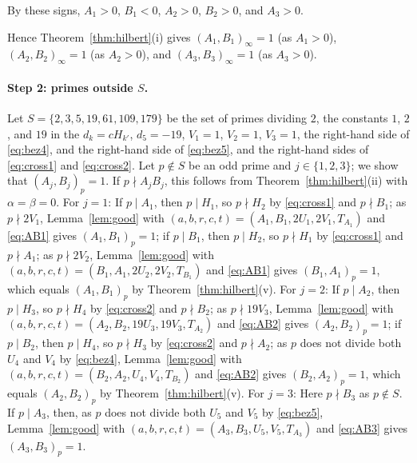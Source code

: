 \documentclass[11pt]{article}
\begin{document}
By these signs, $A_{1}>0$, $B_{1}<0$, $A_{2}>0$, $B_{2}>0$, and $A_{3}>0$.

Hence Theorem~\ref{thm:hilbert}(i) gives $(A_{1},B_{1})_\infty=1$ (as $A_{1}>0$), $(A_{2},B_{2})_\infty=1$ (as $A_{2}>0$), and $(A_{3},B_{3})_\infty=1$ (as $A_{3}>0$).

\paragraph{Step 2: primes outside $S$.} Let $S=\{2,3,5,19,61,109,179\}$ be the set of primes dividing $2$, the constants $1$, $2$, and $19$ in the $d_k=cH_{k'}$, $d_{5}=-19$, $V_{1}=1$, $V_{2}=1$, $V_{3}=1$, the right-hand side of \eqref{eq:bez4}, and the right-hand side of \eqref{eq:bez5}, and the right-hand sides of \eqref{eq:cross1} and \eqref{eq:cross2}. Let $p\notin S$ be an odd prime and $j\in\{1,2,3\}$; we show that $(A_j,B_j)_p=1$. If $p\nmid A_jB_j$, this follows from Theorem~\ref{thm:hilbert}(ii) with $\alpha=\beta=0$. For $j=1$: If $p\mid A_{1}$, then $p\mid H_{1}$, so $p\nmid H_{2}$ by \eqref{eq:cross1} and $p\nmid B_{1}$; as $p\nmid 2V_{1}$, Lemma~\ref{lem:good} with $(a,b,r,c,t)=(A_{1},B_{1},2U_{1},2V_{1},T_{A_{1}})$ and \eqref{eq:AB1} gives $(A_{1},B_{1})_p=1$; if $p\mid B_{1}$, then $p\mid H_{2}$, so $p\nmid H_{1}$ by \eqref{eq:cross1} and $p\nmid A_{1}$; as $p\nmid 2V_{2}$, Lemma~\ref{lem:good} with $(a,b,r,c,t)=(B_{1},A_{1},2U_{2},2V_{2},T_{B_{1}})$ and \eqref{eq:AB1} gives $(B_{1},A_{1})_p=1$, which equals $(A_{1},B_{1})_p$ by Theorem~\ref{thm:hilbert}(v). For $j=2$: If $p\mid A_{2}$, then $p\mid H_{3}$, so $p\nmid H_{4}$ by \eqref{eq:cross2} and $p\nmid B_{2}$; as $p\nmid 19V_{3}$, Lemma~\ref{lem:good} with $(a,b,r,c,t)=(A_{2},B_{2},19U_{3},19V_{3},T_{A_{2}})$ and \eqref{eq:AB2} gives $(A_{2},B_{2})_p=1$; if $p\mid B_{2}$, then $p\mid H_{4}$, so $p\nmid H_{3}$ by \eqref{eq:cross2} and $p\nmid A_{2}$; as $p$ does not divide both $U_{4}$ and $V_{4}$ by \eqref{eq:bez4}, Lemma~\ref{lem:good} with $(a,b,r,c,t)=(B_{2},A_{2},U_{4},V_{4},T_{B_{2}})$ and \eqref{eq:AB2} gives $(B_{2},A_{2})_p=1$, which equals $(A_{2},B_{2})_p$ by Theorem~\ref{thm:hilbert}(v). For $j=3$: Here $p\nmid B_{3}$ as $p\notin S$. If $p\mid A_{3}$, then, as $p$ does not divide both $U_{5}$ and $V_{5}$ by \eqref{eq:bez5}, Lemma~\ref{lem:good} with $(a,b,r,c,t)=(A_{3},B_{3},U_{5},V_{5},T_{A_{3}})$ and \eqref{eq:AB3} gives $(A_{3},B_{3})_p=1$.
\end{document}

